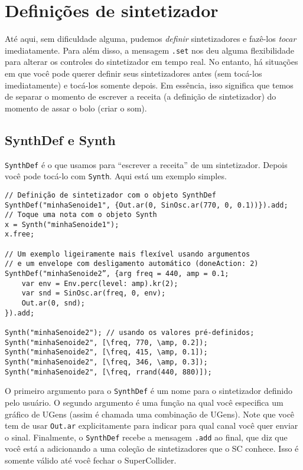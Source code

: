 \section{Definições de sintetizador}
\label{sec:synthdef}

Até aqui, sem dificuldade alguma, pudemos \emph{definir} sintetizadores e fazê-los \emph{tocar} imediatamente. Para além disso, a mensagem \texttt{.set} nos deu alguma flexibilidade para alterar os controles do sintetizador em tempo real. No entanto, há situações em que você pode querer definir seus sintetizadores antes (sem tocá-los imediatamente) e tocá-los somente depois. Em essência, isso significa que temos de separar o momento de escrever a receita (a definição de sintetizador) do momento de assar o bolo (criar o som).


\subsection{SynthDef e Synth}

\texttt{SynthDef} é o que usamos para “escrever a receita” de um sintetizador. Depois você pode tocá-lo com \texttt{Synth}. Aqui está um exemplo simples.

\begin{lstlisting}[style=SuperCollider-IDE, basicstyle=\scttfamily\footnotesize]
// Definição de sintetizador com o objeto SynthDef
SynthDef("minhaSenoide1", {Out.ar(0, SinOsc.ar(770, 0, 0.1))}).add;
// Toque uma nota com o objeto Synth
x = Synth("minhaSenoide1");
x.free;

// Um exemplo ligeiramente mais flexível usando argumentos
// e um envelope com desligamento automático (doneAction: 2)
SynthDef("minhaSenoide2”, {arg freq = 440, amp = 0.1; 
	var env = Env.perc(level: amp).kr(2);
	var snd = SinOsc.ar(freq, 0, env);
	Out.ar(0, snd);
}).add;

Synth("minhaSenoide2"); // usando os valores pré-definidos;
Synth("minhaSenoide2", [\freq, 770, \amp, 0.2]);
Synth("minhaSenoide2", [\freq, 415, \amp, 0.1]);
Synth("minhaSenoide2", [\freq, 346, \amp, 0.3]);
Synth("minhaSenoide2", [\freq, rrand(440, 880)]);
\end{lstlisting}

O primeiro argumento para o \texttt{SynthDef} é um nome para o sintetizador definido pelo usuário. O segundo argumento é uma função na qual você especifica um gráfico de UGens (assim é chamada uma combinação de UGens). Note que você tem de usar \texttt{Out.ar} explicitamente para indicar para qual canal você quer enviar o sinal. Finalmente, o \texttt{SynthDef} recebe a mensagem  \texttt{.add} ao final, que diz que você está a adicionando a uma coleção de sintetizadores que o SC conhece. Isso é somente válido até você fechar o SuperCollider.

